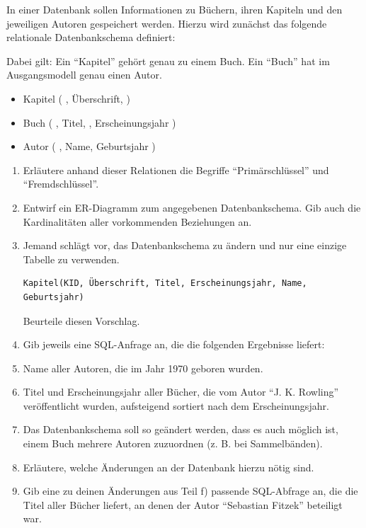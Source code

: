 \question[8]
In einer Datenbank sollen Informationen zu Büchern, ihren Kapiteln und den jeweiligen Autoren
gespeichert werden. Hierzu wird zunächst das folgende relationale Datenbankschema definiert:

Dabei gilt: Ein \enquote{Kapitel} gehört genau zu einem Buch. Ein \enquote{Buch} hat im
Ausgangsmodell genau einen Autor.

\begin{itemize}
\item Kapitel ( , Überschrift,  )
\item Buch ( , Titel, , Erscheinungsjahr )
\item Autor ( , Name, Geburtsjahr )
\end{itemize}

\begin{enumerate}[label=\alph*)]
\item Erläutere anhand dieser Relationen die Begriffe \enquote{Primärschlüssel} und
\enquote{Fremdschlüssel}.

\item Entwirf ein ER-Diagramm zum angegebenen Datenbankschema. Gib auch
die Kardinalitäten aller vorkommenden Beziehungen an.

\item Jemand schlägt vor, das Datenbankschema zu ändern und nur eine
einzige Tabelle zu verwenden.
\begin{verbatim}
Kapitel(KID, Überschrift, Titel, Erscheinungsjahr, Name, Geburtsjahr)
\end{verbatim}
Beurteile diesen Vorschlag.

\item[]\hspace*{-\leftmargin}Gib jeweils eine SQL-Anfrage an, die die folgenden Ergebnisse liefert:

\item Name aller Autoren, die im Jahr 1970 geboren wurden.

\item Titel und Erscheinungsjahr aller Bücher, die vom Autor \enquote{J. K. Rowling}
veröffentlicht wurden, aufsteigend sortiert nach dem Erscheinungsjahr.

\item[]\hspace*{-\leftmargin}Das Datenbankschema soll so geändert werden, dass es auch möglich ist, einem Buch mehrere
Autoren zuzuordnen (z. B. bei Sammelbänden).

\item Erläutere, welche Änderungen an der Datenbank hierzu nötig sind.

\item Gib eine zu deinen Änderungen aus Teil f) passende SQL-Abfrage an, die die Titel
aller Bücher liefert, an denen der Autor \enquote{Sebastian Fitzek} beteiligt war.
\end{enumerate}

